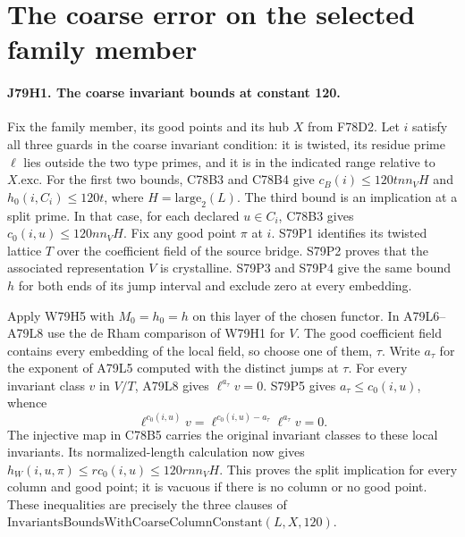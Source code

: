 \section{The coarse error on the selected family member}

\paragraph{J79H1. The coarse invariant bounds at constant 120.}
Fix the family member, its good points and its hub $X$ from F78D2.
Let $i$ satisfy all three guards in the coarse invariant condition:
it is twisted, its residue prime $\ell$ lies outside the two type
primes, and it is in the indicated range relative to $X.\mathrm{exc}$.
For the first two bounds, C78B3 and C78B4 give
$c_B(i)\le120tn n_V H$ and $h_0(i,C_i)\le120t$,
where $H=\mathrm{large}_2(L)$.
The third bound is an implication at a split prime. In that case,
for each declared $u\in C_i$, C78B3 gives
$c_0(i,u)\le120n n_VH$. Fix any good point $\pi$ at $i$. S79P1
identifies its twisted lattice $T$ over the coefficient field of
the source bridge. S79P2 proves that the associated representation
$V$ is crystalline. S79P3 and S79P4 give the same bound $h$ for
both ends of its jump interval and exclude zero at every embedding.

Apply W79H5 with $M_0=h_0=h$ on this layer of the chosen functor.
In A79L6--A79L8 use the de Rham comparison of W79H1 for $V$.
The good coefficient field contains every embedding of the local
field, so choose one of them, $\tau$. Write $a_\tau$ for the
exponent of A79L5 computed with the distinct jumps at $\tau$.
For every invariant class $v$ in $V/T$, A79L8 gives
$\ell^{a_\tau}v=0$. S79P5 gives $a_\tau\le c_0(i,u)$, whence
\[
       \ell^{c_0(i,u)}v=\ell^{c_0(i,u)-a_\tau}\ell^{a_\tau}v=0 .
\]
The injective map in C78B5 carries the original invariant classes
to these local invariants. Its normalized-length calculation now gives
$h_W(i,u,\pi)\le r c_0(i,u)\le120rn n_VH$.
This proves the split implication for every column and good point;
it is vacuous if there is no column or no good point.
These inequalities are precisely the three clauses of
$\mathrm{InvariantsBoundsWithCoarseColumnConstant}(L,X,120)$.

